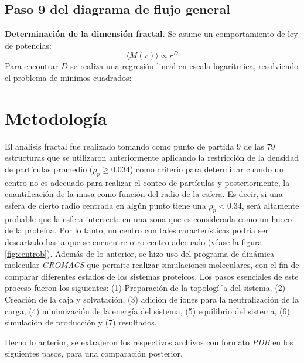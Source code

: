 		

 	
 	\subsection{Paso 9 del diagrama de flujo general}
 		

 	\textbf{Determinación de la dimensión fractal.}  
 	Se asume un comportamiento de ley de potencias:
 	\begin{equation}
 		\langle M(r) \rangle \propto r^D
 	\end{equation}
 	Para encontrar $D$ se realiza una regresión lineal en escala logarítmica,
 	resolviendo el problema de mínimos cuadrados:
 
 		
 	\color{black}
 	
 	\section{Metodolog\'{i}a}
 	
 	El an\'{a}lisis fractal fue realizado tomando como punto de partida 9 de las 79 estructuras que se utilizaron anteriormente aplicando la restricci\'{o}n de la densidad de part\'{i}culas  promedio ($\rho_{p} \geq 0.034$) como criterio para determinar cuando un centro no es adecuado para realizar el conteo de part\'{i}culas y posteriormente, la cuantificaci\'{o}n de la masa como funci\'{o}n del radio de la esfera. Es decir, si una esfera de cierto radio centrada en alg\'{u}n punto tiene una $\rho_{p} < 0.34$, ser\'{a} altamente probable que la esfera intersecte en una zona que es considerada como un hueco de la prote\'{i}na. Por lo tanto, un centro con tales caracter\'{i}sticas podr\'{i}a ser descartado hasta que se encuentre otro centro adecuado (v\'{e}ase la figura \ref{fig:centrob}). Adem\'{a}s de lo anterior, se hizo uso del programa de din\'{a}mica molecular \textit{GROMACS}\cite{Lemkul2024, Abraham2015} que permite realizar simulaciones moleculares, con el fin de comparar diferentes estados de los sistemas proteicos. Los pasos esenciales de este proceso fueron los siguientes: (1) Preparaci\'{o}n de la topolog\'{i´}a del sistema. (2) Creaci\'{o}n de la caja y solvataci\'{o}n, (3) adici\'{o}n de iones para la neutralizaci\'{o}n de la carga, (4) minimizaci\'{o}n de la energ\'{i}a del sistema, (5) equilibrio del sistema, (6) simulaci\'{o}n de producci\'{o}n y (7) resultados.
 	
 	
 	
 	Hecho lo anterior, se extrajeron los respectivos archivos con formato \textit{PDB} en 
 	los siguientes pasos, para una comparaci\'{o}n posterior.
 	
